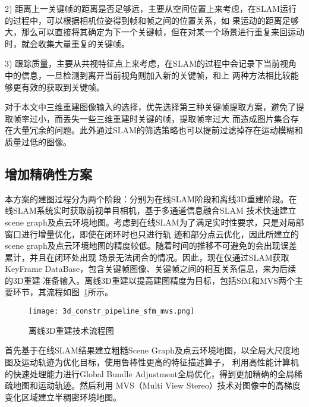 2)	距离上一关键帧的距离是否足够远，主要从空间位置上来考虑，在SLAM运行的过程中，可以根据相机位姿得到帧和帧之间的位置关系，如
果运动的距离足够大，那么可以直接将其确定为下一个关键帧，但在对某一个场景进行重复来回运动时，就会收集大量重复的关键帧。

3)	跟踪质量，主要从共视特征点上来考虑，在SLAM的过程中会记录下当前视角中的信息，一旦检测到离开当前视角则加入新的关键帧，和上
两种方法相比较能够更有效的获取到关键帧。

对于本文中三维重建图像输入的选择，优先选择第三种关键帧提取方案，避免了提取帧率过小，而丢失一些三维重建时关键的帧，提取帧率过大
而造成图片集合存在大量冗余的问题。此外通过SLAM的筛选策略也可以提前过滤掉存在运动模糊和质量过低的图像。
\subsection{增加精确性方案}
\label{sec:3.3.3}
本方案的建图过程分为两个阶段：分别为在线SLAM阶段和离线3D重建阶段。在线SLAM系统实时获取前视单目相机，基于多通道信息融合SLAM
技术快速建立scene graph及点云环境地图。考虑到在线SLAM为了满足实时性要求，只是对局部窗口进行增量优化，即使在闭环时也只进行轨
迹和部分点云优化，因此所建立的scene graph及点云环境地图的精度较低。随着时间的推移不可避免的会出现误差累计，并且在闭环处出现
场景无法闭合的情况。因此，现在仅通过SLAM获取KeyFrame DataBase，包含关键帧图像、关键帧之间的相互关系信息，来为后续的3D重建
准备输入。离线3D重建以提高建图精度为目标，包括SfM和MVS两个主要环节，其流程如图~\ref{fig:3d_constr_pipeline_sfm_mvs}所示。
\begin{figure}[H] %
  \centering
  \texttt{[image: 3d\_constr\_pipeline\_sfm\_mvs.png]}
  \caption{离线3D重建技术流程图}
  \label{fig:3d_constr_pipeline_sfm_mvs}
\end{figure}
首先基于在线SLAM结果建立粗糙Scene Graph及点云环境地图，以全局大尺度地图及运动轨迹为优化目标，使用鲁棒性更高的特征描述算子，
利用高性能计算机的快速处理能力进行Global Bundle Adjustment全局优化，得到更加精确的全局稀疏地图和运动轨迹。然后利用
MVS（Multi View Stereo）技术对图像中的高梯度变化区域建立半稠密环境地图。
